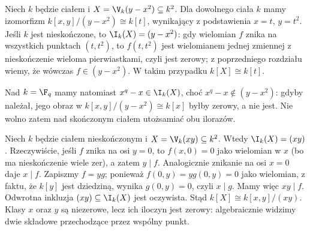 \begin{przyklad}[Parabola]
Niech $k$ będzie ciałem i $X=\V_k(y-x^2)\subseteq k^2$.
Dla dowolnego ciała $k$ mamy izomorfizm
$k[x,y]/(y-x^2)\cong k[t]$, wynikający z podstawienia
$x=t$, $y=t^2$. Jeśli $k$ jest nieskończone, to
$\I_k(X)=(y-x^2)$: gdy wielomian $f$ znika na wszystkich
punktach $(t,t^2)$, to $f(t,t^2)$ jest wielomianem jednej
zmiennej z nieskończenie wieloma pierwiastkami, czyli jest zerowy;
z poprzedniego rozdziału wiemy, że wówczas $f\in(y-x^2)$.
W takim przypadku $k[X]\cong k[t]$.

Nad $k=\F_q$ mamy natomiast $x^q-x\in\I_k(X)$,
choć $x^q-x\notin(y-x^2)$: gdyby należał, jego obraz w
$k[x,y]/(y-x^2)\cong k[x]$ byłby zerowy, a nie jest.
Nie wolno zatem nad skończonym ciałem utożsamiać obu ilorazów.
\end{przyklad}

\begin{przyklad}
Niech $k$ będzie ciałem nieskończonym i
$X=\V_k(xy)\subseteq k^2$. Wtedy $\I_k(X)=(xy)$.
Rzeczywiście, jeśli $f$ znika na osi $y=0$, to
$f(x,0)=0$ jako wielomian w $x$ (bo ma nieskończenie wiele zer),
a zatem $y\mid f$. Analogicznie znikanie na osi $x=0$
daje $x\mid f$. Zapiszmy $f=yg$; ponieważ $f(0,y)=yg(0,y)=0$
jako wielomian, z faktu, że $k[y]$ jest dziedziną, wynika
$g(0,y)=0$, czyli $x\mid g$. Mamy więc $xy\mid f$.
Odwrotna inkluzja $(xy)\subseteq\I_k(X)$ jest oczywista.
Stąd $k[X]\cong k[x,y]/(xy)$. Klasy $x$ oraz $y$
są niezerowe, lecz ich iloczyn jest zerowy: algebraicznie
widzimy dwie składowe przechodzące przez wspólny punkt.
\end{przyklad}

